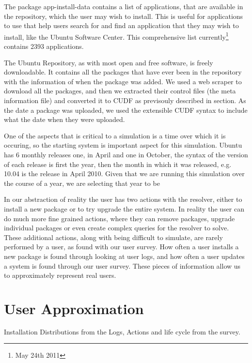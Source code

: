 The package app-install-data contains a list of applications, that are available in the repository, which the user may wish to install.
This is useful for applications to use that help users search for and find an application that they may wish to install, like the Ubuntu Software Center.
This comprehensive list currently\footnote{May 24th 2011} contains 2393 applications.

The Ubuntu Repository, as with most open and free software, is freely downloadable.
It contains all the packages that have ever been in the repository with the information of when the package was added.
We used a web scraper to download all the packages, and then we extracted their control files (the meta information file) and converted it to CUDF as previsouly described in section. %
As the date a package was uploaded, we used the extensible CUDF syntax to include what the date when they were uploaded.

One of the aspects that is critical to a simulation is a time over which it is occuring, 
so the starting system is important aspect for this simulation.
Ubuntu has 6 monthly releases one, in April and one in October, the syntax of the version of each release is first the year,
then the month in which it was released, e.g. 10.04 is the release in April 2010.
Given that we are running this simulation over the course of a year, we are selecting that year to be 


In our abstraction of reality the user has two actions with the resolver, either to install a new package or to try upgrade the entire system.  
In reality the user can do much more fine grained actions, where they can remove packages, 
upgrade individual packages or even create complex queries for the resolver to solve. 
These additional actions, along with being difficult to simulate, are rarely performed by a user, as found with our user survey. %
How often a user installs a new package is found through looking at user logs, %
and how often a user updates a system is found through our user survey.
These pieces of information allow us to approximately represent real users.


\section{User Approximation}
Installation Distributions from the Logs, Actions and life cycle from the survey.

